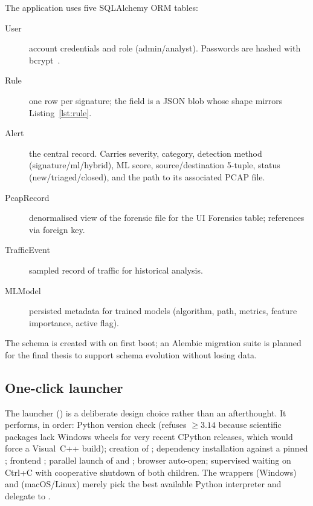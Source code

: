 The application uses five SQLAlchemy ORM tables:
\begin{description}
    \item[User] account credentials and role (admin/analyst).
        Passwords are hashed with bcrypt~\cite{bcrypt}.
    \item[Rule] one row per signature; the  field is a JSON
        blob whose shape mirrors Listing~\ref{lst:rule}.
    \item[Alert] the central record. Carries severity, category,
        detection method (signature/ml/hybrid), ML score, source/destination
        5-tuple, status (new/triaged/closed), and the path to its
        associated PCAP file.
    \item[PcapRecord] denormalised view of the forensic file for the UI
        Forensics table; references  via foreign key.
    \item[TrafficEvent] sampled record of traffic for historical
        analysis.
    \item[MLModel] persisted metadata for trained models (algorithm,
        path, metrics, feature importance, active flag).
\end{description}

The schema is created with  on first
boot; an Alembic migration suite is planned for the final thesis to
support schema evolution without losing data.

\subsection{One-click launcher}

The launcher () is a deliberate design choice rather than
an afterthought. It performs, in order: Python version check (refuses
$\geq 3.14$ because scientific packages lack Windows wheels for very
recent CPython releases, which would force a Visual~C++ build);
creation of ; dependency installation against a
pinned ; frontend ;
parallel launch of  and ; browser
auto-open; supervised waiting on Ctrl+C with cooperative shutdown of
both children. The wrappers  (Windows) and 
(macOS/Linux) merely pick the best available Python interpreter and
delegate to .
